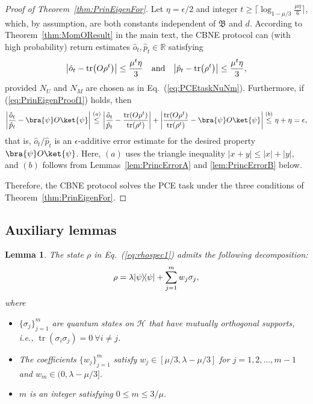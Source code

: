 \documentclass[aps,prl,twocolumn,nofootinbib,superscriptaddress,10pt]{revtex4-2}
\let\originalleft\left
\let\originalright\right
\renewcommand{\left}{\mathopen{}\mathclose\bgroup\originalleft}
\renewcommand{\right}{\aftergroup\egroup\originalright}
\def\R{ \mathbb{R} }
\newcommand{\ketbra}[2]{\ensuremath{\left|#1\right\rangle\!\left\langle#2\right|}}
\newcommand{\tr}[1]{\mathrm{tr}\left( #1 \right)}
\DeclareMathOperator{\Tr}{tr}
\theoremstyle{plain}
\newtheorem{lemma}{Lemma}
\theoremstyle{definition}
\newcommand{\caH}{\mathcal{H}}
\def\eqref#1{\textup{(\ref{#1})}}
\newcommand{\eref}[1]{Eq.~\textup{(\ref{#1})}}
\newcommand{\tref}[1]{Theorem~\ref{#1}}
\begin{document}
\begin{proof}[Proof of \tref{thm:PrinEigenFor}] 
	Let $\eta = \epsilon/2$ and integer $t \geq \lceil \log_{1-\mu/3} \frac{\mu \eta}{6} \rceil$, 
	which, by assumption, are both constants independent of $\mathfrak{B}$ and $d$. 
	According to \tref{thm:MomOResult} in the main text, the CBNE protocol can (with high probability) return estimates $\hat{o}_t, \hat{p}_t \in \R$ satisfying 
	\begin{align}\label{eq:PrinEigenProof1}
		\left| \hat{o}_t - \tr{O\rho^t}\right| \leq \frac{\mu^t \eta}{3}
		\quad \text{and} \quad
		\left| \hat{p}_t - \tr{\rho^t}\right| \leq \frac{\mu^t \eta}{3},
	\end{align}
	provided $N_U$ and $N_M$ are chosen as in \eref{eq:PCEtaskNuNm}. 
	Furthermore, if \eqref{eq:PrinEigenProof1} holds, then
	\begin{align}
		\left| \frac{\hat{o}_t}{\hat{p}_t} - \bra{\psi}O\ket{\psi} \right|
		\stackrel{(a)}{\leq}  
		\left| \frac{\hat{o}_t}{\hat{p}_t} - \frac{\tr{O\rho^t}}{\tr{\rho^t}} \right|
		+ \left| \frac{\tr{O\rho^t}}{\tr{\rho^t}} - \bra{\psi}O\ket{\psi} \right| 
		\stackrel{(b)}{\leq} \eta + \eta = \epsilon, 
	\end{align}
	that is, $\hat{o}_t/\hat{p}_t$ is an $\epsilon$-additive error estimate for the desired property $\bra{\psi}O\ket{\psi}$. 
	Here, $(a)$ uses the triangle inequality $|x+y|\leq |x|+|y|$, and $(b)$ follows from Lemmas~\ref{lem:PrincErrorA} and \ref{lem:PrincErrorB} below. 
	
	Therefore, the CBNE protocol solves the PCE task under the three conditions of \tref{thm:PrinEigenFor}.
\end{proof}


\subsection{Auxiliary lemmas}

\begin{lemma}\label{lem:PrincErrorALem1}
	The state $\rho$ in \eref{eq:rhospec1} admits the following decomposition: 
	\begin{align}\label{eq:PrincErrorArho}
		\rho = \lambda\ketbra{\psi}{\psi} + \sum_{j=1}^m w_j \sigma_j, 
	\end{align}
	where  
	\begin{itemize}
		\item[$(i)$] $\{\sigma_j\}_{j=1}^m$ are quantum states on $\caH$ that have mutually orthogonal supports, 
		i.e., $\Tr(\sigma_i\sigma_j) = 0\  \forall i \neq j$. 
		
		\item[$(ii)$] The coefficients $\{w_j\}_{j=1}^m$ satisfy 
		$w_j \in [\mu/3, \lambda-\mu/3]$ for $j=1,2,\dots,m-1$ and $w_m \in (0, \lambda-\mu/3]$.
		
		\item[$(iii)$] $m$ is an integer satisfying $0\leq m\leq 3/\mu$. 
	\end{itemize}
\end{lemma}
\end{document}
